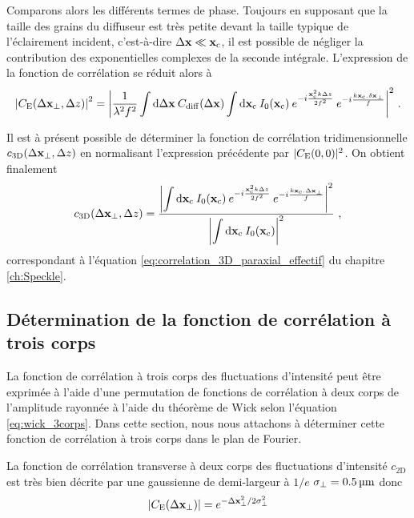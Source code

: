 Comparons alors les différents termes de phase. Toujours en supposant que la taille des grains du diffuseur est très petite devant la taille typique de l'éclairement incident, c'est-à-dire $\Delta\mathbf{x} \ll \mathbf{x}_{\mathrm{c}}$, il est possible de négliger la contribution des exponentielles complexes de la seconde intégrale. L'expression de la fonction de corrélation se réduit alors à
\begin{equation}
{\left| C_{\mathrm{E}}(\Delta \mathbf{x}_{\perp} ,\Delta z)\right|}^2= {\left| \frac{1}{\lambda^2 f^2}  \int{\mathop{}\mathopen{}\mathrm{d}\Delta\mathbf{x}\: C_{\mathrm{diff}}(\Delta\mathbf{x})} \int{\mathop{}\mathopen{}\mathrm{d}\mathbf{x}_{\mathrm{c}}\: I_0(\mathbf{x}_{\mathrm{c}}) \: e^{-i\frac{\mathbf{x}_{\mathrm{c}}^2 k \Delta z}{2f^2}} \: e^{-i \frac{k \mathbf{x}_{\mathrm{c}}. \delta \mathbf{x}_{\perp}}{f}}} \right|}^2 \text{ .}
\end{equation}

Il est à présent possible de déterminer la fonction de corrélation tridimensionnelle $c_{\mathrm{3D}}(\Delta\mathbf{x}_{\perp}, \Delta z)$ en normalisant l'expression précédente par $|C_{\mathrm{E}}(0,0)|^2$. On obtient finalement
\begin{equation}
c_{\mathrm{3D}}(\Delta \mathbf{x}_{\perp} , \Delta z) = \frac{{\left| \displaystyle\int{\mathop{}\mathopen{}\mathrm{d}\mathbf{x}_{\mathrm{c}}\: I_0(\mathbf{x}_{\mathrm{c}}) \: e^{-i\frac{\mathbf{x}_{\mathrm{c}}^2 k \Delta z}{2 f^2}} \: e^{-i\frac{k \mathbf{x}_{\mathrm{c}}. \Delta \mathbf{x}_{\perp}}{f}}}\right|}^2}{{\left|\displaystyle\int{\mathop{}\mathopen{}\mathrm{d}\mathbf{x}_{\mathrm{c}}\: I_0(\mathbf{x}_{\mathrm{c}})}\right|}^2} \text{ ,}
\end{equation}
correspondant à l'équation \ref{eq:correlation_3D_paraxial_effectif} du chapitre \ref{ch:Speckle}.

\subsection{Détermination de la fonction de corrélation à trois corps}
La fonction de corrélation à trois corps des fluctuations d'intensité peut être exprimée à l'aide d'une permutation de fonctions de corrélation à deux corps de l'amplitude rayonnée à l'aide du théorème de Wick selon l'équation \ref{eq:wick_3corps}. Dans cette section, nous nous attachons à déterminer cette fonction de corrélation à trois corps dans le plan de Fourier.

La fonction de corrélation transverse à deux corps des fluctuations d'intensité $c_{\mathrm{2D}}$ est très bien décrite par une gaussienne de demi-largeur à $1/e$ $\sigma_{\perp}=\SI{0.5}{\micro\metre}$ donc
\begin{equation}
\left|C_{\mathrm{E}}(\Delta\mathbf{x}_{\perp})\right|=e^{-\Delta\mathbf{x}_{\perp}^2/2\sigma_{\perp}^2}
\end{equation}

